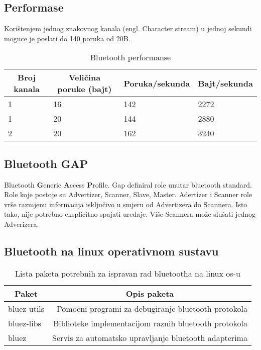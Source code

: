 \documentclass[times, utf8, diplomski]{fer}
\begin{document}
\subsection{Performase}
Kori\v{s}tenjem jednog znakovnog kanala (engl. Character stream) u jednoj sekundi moguce je poslati do 140 poruka od 20B.

\begin{table}[h]
  \begin{center}
    \begin{tabular}[c]{l|l|l|l}
      \hline
      \multicolumn{1}{c|}{\textbf{Broj kanala}} &
      \multicolumn{1}{c}{\textbf{Veli\v{c}ina poruke (bajt)}} &
      \multicolumn{1}{c}{\textbf{Poruka/sekunda}} &
      \multicolumn{1}{c}{\textbf{Bajt/sekunda}} \\
      \hline
      1 & 16 & 142 & 2272 \\
      1 & 20 & 144 & 2880 \\
      2 & 20 & 162 & 3240 \\
      \hline
    \end{tabular}
  \caption{Bluetooth performanse}
  \end{center}
\end{table}


\subsection{Bluetooth GAP}
Bluetooth \textbf{G}eneric \textbf{A}ccess \textbf{P}rofile.
Gap definiral role unutar bluetooth standard. Role koje postoje su Advertizer, Scanner, Slave, Master. Adertizer i Scanner role vr\v{s}e razmjenu informacija isklju\v{c}ivo u smjeru
od Advertizera do Scannera. Isto tako, nije potrebno eksplicitno spajati uredaje.
Vi\v{s}e Scannera mo\v{z}e slu\v{s}ati jednog Adverizera.

\subsection{Bluetooth na linux operativnom sustavu}

\begin{table}[h]
  \begin{center}
    \begin{tabular}[c]{l|r}
      \multicolumn{1}{c|}{\textbf{Paket}} & 
      \multicolumn{1}{c}{\textbf{Opis paketa}} \\
      \hline
      bluez-utils & Pomocni programi za debugiranje bluetooth protokola \\
      bluez-libs & Biblioteke implementacijom raznih bluetooth protokola \\
      bluez & Servis za automatsko upravljanje bluetooth adapterima \\
      \hline
    \end{tabular}
  \caption{Lista paketa potrebnih za ispravan rad bluetootha na linux os-u}
  \end{center}
\end{table}
\end{document}
